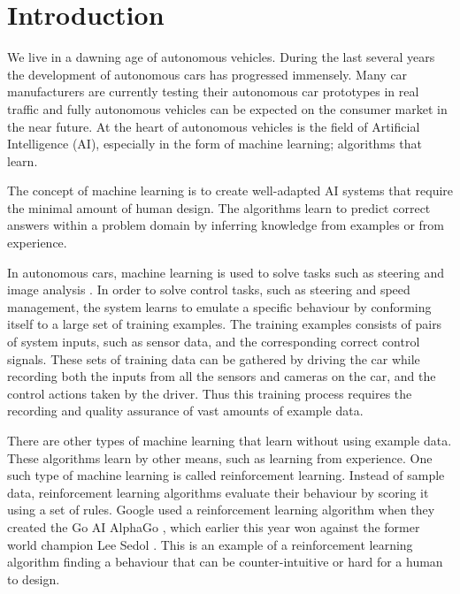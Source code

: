 \chapter{Introduction}
\label{introduction}

We live in a dawning age of autonomous vehicles. During the last several years the development of autonomous cars has progressed immensely. Many car manufacturers are currently testing their autonomous car prototypes in real traffic and fully autonomous vehicles can be expected on the consumer market in the near future. At the heart of autonomous vehicles is the field of Artificial Intelligence (AI), especially in the form of machine learning; algorithms that learn.

The concept of machine learning is to create well-adapted AI systems that require the minimal amount of human design. The algorithms learn to predict correct answers within a problem domain by inferring knowledge from examples or from experience. 

In autonomous cars, machine learning is used to solve tasks such as steering and image analysis \cite{Stavens, Thrun06, huval2015empirical}. In order to solve control tasks, such as steering and speed management, the system learns to emulate a specific behaviour by conforming itself to a large set of training examples. The training examples consists of pairs of system inputs, such as sensor data, and the corresponding correct control signals. These sets of training data can be gathered by driving the car while recording both the inputs from all the sensors and cameras on the car, and the control actions taken by the driver. Thus this training process requires the recording and quality assurance of vast amounts of example data.

There are other types of machine learning that learn without using example data. These algorithms learn by other means, such as learning from experience. One such type of machine learning is called reinforcement learning. Instead of sample data, reinforcement learning algorithms evaluate their behaviour by scoring it using a set of rules. Google used a reinforcement learning algorithm when they created the Go AI AlphaGo \cite{gibney}, which earlier this year won against the former world champion Lee Sedol \cite{AlphaGo}. This is an example of a reinforcement learning algorithm finding a behaviour that can be counter-intuitive or hard for a human to design.

